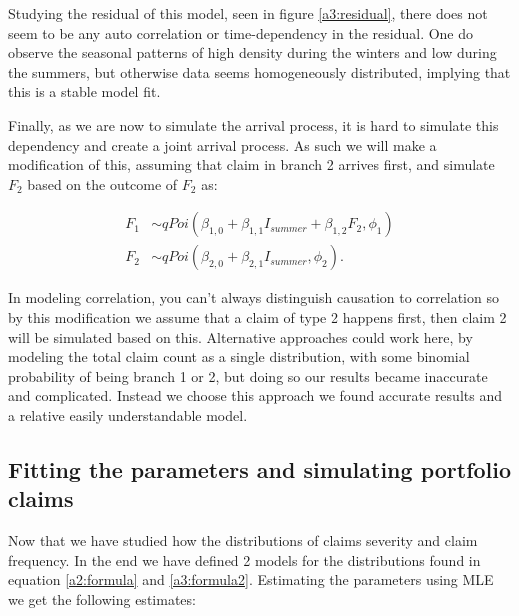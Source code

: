 \documentclass[11pt]{article}
\begin{document}
Studying the residual of this model, seen in figure \ref{a3:residual}, there does not seem to be any auto correlation or time-dependency in the residual. 
One do observe the seasonal patterns of high density during the winters and low during the summers, but otherwise data seems homogeneously distributed, implying that this is a stable model fit.

Finally, as we are now to simulate the arrival process, it is hard to simulate this dependency and create a joint arrival process.
As such we will make a modification of this, assuming that claim in branch 2 arrives first, and simulate $F_2$ based on the outcome of $F_2$ as:

\begin{equation}
    \begin{split}
       F_{1} &\sim qPoi(\beta_{1,0}+\beta_{1,1}I_{summer}+\beta_{1,2}F_2,\phi_1)\\
       F_{2} &\sim qPoi(\beta_{2,0}+\beta_{2,1}I_{summer},\phi_2).
\end{split}
\label{a3:formula2}
\end{equation}

In modeling correlation, you can't always distinguish causation to correlation so by this modification we assume that a claim of type 2 happens first, then claim 2 will be simulated based on this.
Alternative approaches could work here, by modeling the total claim count as a single distribution, with some binomial probability of being branch 1 or 2, but doing so our results became inaccurate and complicated. 
Instead we choose this approach we found accurate results and a relative easily understandable model.

\subsection*{Fitting the parameters and simulating portfolio claims}
Now that we have studied how the distributions of claims severity and claim frequency. 
In the end we have defined 2 models for the distributions found in equation \ref{a2:formula} and \ref{a3:formula2}.
Estimating the parameters using MLE we get the following estimates:
\end{document}
